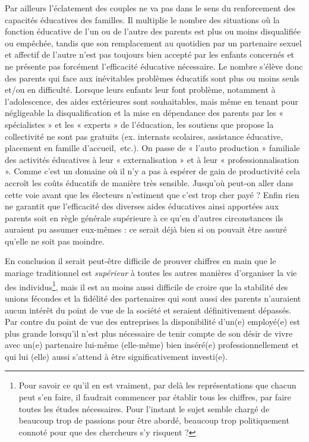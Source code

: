 Par ailleurs l'éclatement des couples ne va pas dans le sens du renforcement des capacités éducatives des familles. Il multiplie le nombre des situations où la fonction éducative de l'un ou de l'autre des parents est plus ou moins disqualifiée ou empêchée, tandis que son remplacement au quotidien par un partenaire sexuel et affectif de l'autre n'est pas toujours bien accepté par les enfants concernés et ne présente pas forcément l'efficacité éducative nécessaire. Le nombre s'élève donc des parents qui face aux inévitables problèmes éducatifs sont plus ou moins seuls et/ou en difficulté. Lorsque leurs enfants leur font problème, notamment à l'adolescence, des aides extérieures sont souhaitables, mais même en tenant pour négligeable la disqualification et la mise en dépendance des parents par les « spécialistes » et les « experts » de l'éducation, les soutiens que propose la collectivité ne sont pas gratuits (ex. internats scolaires, assistance éducative, placement en famille d'accueil,~etc.). On passe de « l'auto production » familiale des activités éducatives à leur « externalisation » et à leur « professionnalisation ». Comme c'est un domaine où il n'y a pas à espérer de gain de productivité cela accroît les coûts éducatifs de manière très sensible. Jusqu'où peut-on aller dans cette voie avant que les électeurs n'estiment que c'est trop cher payé ? Enfin rien ne garantit que l'efficacité des diverses aides éducatives ainsi apportées aux parents soit en règle générale supérieure à ce qu'en d'autres circonstances ils auraient pu assumer eux-mêmes : ce serait déjà bien si on pouvait être assuré qu'elle ne soit pas moindre. 

En conclusion il serait peut-être difficile de prouver chiffres en main que le mariage traditionnel est \emph{supérieur} à toutes les autres manières d'organiser la vie des individus\footnote{Pour savoir ce qu'il en est vraiment, par delà les représentations que chacun peut s'en faire, il faudrait commencer par établir tous les chiffres, par faire toutes les études nécessaires. Pour l'instant le sujet semble chargé de beaucoup trop de passions pour être abordé, beaucoup trop politiquement connoté pour que des chercheurs s'y risquent ?}, mais il est au moins aussi difficile de croire que la stabilité des unions fécondes et la fidélité des partenaires qui sont aussi des parents n'auraient aucun intérêt du point de vue de la société et seraient définitivement dépassés. Par contre du point de vue des entreprises la disponibilité d'un(e) employé(e) est plus grande lorsqu'il n'est plus nécessaire de tenir compte de son désir de vivre avec un(e) partenaire lui-même (elle-même) bien inséré(e) professionnellement et qui lui (elle) aussi s'attend à être significativement investi(e).

